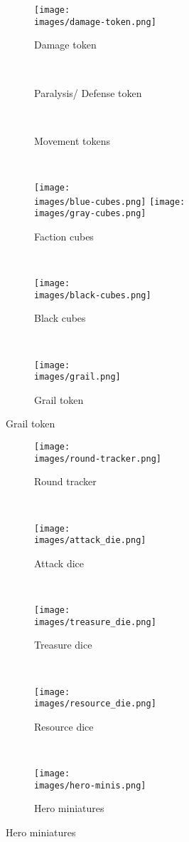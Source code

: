 \begin{figure}[H]
	\centering
	\begin{subfigure}[b]{0.08\linewidth}
		\centering
		\texttt{[image: \\images/damage-token.png]}
		\caption{\centering Damage token}
	\end{subfigure}
	~
	\begin{subfigure}[b]{0.15\linewidth}
		\caption{\centering Paralysis/ Defense token}
	\end{subfigure}
	~
	\begin{subfigure}[b]{0.15\linewidth}
		
		\caption{\centering Movement tokens}
	\end{subfigure}
	~
	\begin{subfigure}[b]{0.15\linewidth}
		\centering
		\texttt{[image: \\images/blue-cubes.png]}
		\texttt{[image: \\images/gray-cubes.png]}
		\caption{\centering Faction cubes}
	\end{subfigure}
	~
	\begin{subfigure}[b]{0.15\linewidth}
		\texttt{[image: \\images/black-cubes.png]}
		\caption{\centering Black cubes}
	\end{subfigure}
	~
	\begin{subfigure}[b]{0.15\linewidth}
		\texttt{[image: \\images/grail.png]}
		\caption{\centering Grail token}
	\end{subfigure}
\end{figure}
\vspace*{-2em}
\begin{figure}[H]
	\centering
	\begin{subfigure}[b]{0.3\linewidth}
		\texttt{[image: \\images/round-tracker.png]}
		\caption{\centering Round tracker}
	\end{subfigure}
	~
	\begin{subfigure}[b]{0.07\linewidth}
		\texttt{[image: \\images/attack\_die.png]}
		\caption{\centering Attack dice}
	\end{subfigure}
	~
	\begin{subfigure}[b]{0.1\linewidth}
		\texttt{[image: \\images/treasure\_die.png]}
		\caption{\centering Treasure dice}
	\end{subfigure}
	~
	\begin{subfigure}[b]{0.1\linewidth}
		\texttt{[image: \\images/resource\_die.png]}
		\caption{\centering Resource dice}
	\end{subfigure}
	~
	\begin{subfigure}[b]{0.3\linewidth}
		\texttt{[image: \\images/hero-minis.png]}
		\vspace*{-2em}
		\caption{\centering Hero miniatures}
	\end{subfigure}
\end{figure}
